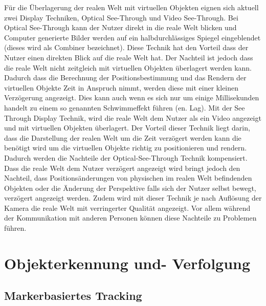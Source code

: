 \cite[S.~32]{Tonnis2010} Für die Überlagerung der realen Welt mit virtuellen Objekten eignen sich aktuell zwei Display Techniken, Optical See-Through und Video See-Through. 
Bei Optical See-Through kann der Nutzer direkt in die reale Welt blicken und Computer generierte Bilder werden auf ein halbdurchlässiges Spiegel eingeblendet (dieses wird als Combiner bezeichnet).
Diese Technik hat den Vorteil dass der Nutzer einen direkten Blick auf die reale Welt hat. Der Nachteil ist jedoch dass die reale Welt nicht zeitgleich mit virtuellen Objekten überlagert werden kann. 
Dadurch dass die Berechnung der Positionsbestimmung und das Rendern der virtuellen Objekte Zeit in Anspruch nimmt, werden diese mit einer kleinen Verzögerung angezeigt. Dies kann auch 
wenn es sich nur um einige Millisekunden handelt zu einem so genannten Schwimmeffekt führen (en. Lag). Mit der See Through Display Technik, wird die reale Welt dem Nutzer als ein Video 
angezeigt und mit virtuellen Objekten überlagert. Der Vorteil dieser Technik liegt darin, dass die Darstellung der realen Welt um die Zeit verzögert werden kann die benötigt wird um die virtuellen Objekte 
richtig zu positionieren und rendern. Dadurch werden die Nachteile der Optical-See-Through Technik kompensiert. Dass die reale Welt dem Nutzer verzögert angezeigt wird bringt jedoch den Nachteil, 
dass Positionsänderungen von physischen im realen Welt befindenden Objekten oder die Änderung der Perspektive falls sich der Nutzer selbst bewegt, verzögert angezeigt werden. Zudem wird mit 
dieser Technik je nach Auflösung der Kamera die reale Welt mit verringerter Qualität angezeigt. \cite[S.~368]{DieterSchmalstieg2016} Vor allem während der Kommunikation mit anderen Personen können diese 
Nachteile zu Problemen führen. 

\section{Objekterkennung und- Verfolgung}




\subsection{Markerbasiertes Tracking}



